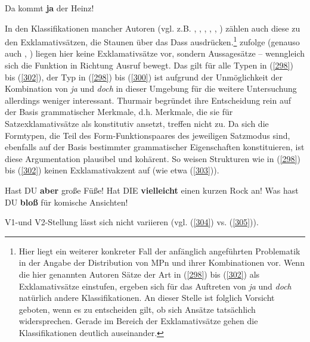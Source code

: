 \begin{exe}
	\ex\label{302} 
	Da kommt \textbf{ja} der Heinz!
	\hfill\hbox {\citet[107-108/215]{Thurmair1989}}
\end{exe}
In den Klassifikationen mancher Autoren (vgl. z.B. \citealt[13]{Weydt1983b}, \citealt[157]{Hentschel1986}, \citealt[313]{Foolen1989}, \citealt[166-167]{Helbig1990}, \citealt[197]{Karagjosova2004}, \citealt[160-168]{Rinas2006}) zählen auch diese zu den Exklamativsätzen, die Staunen über das Dass ausdrücken.\footnote{Hier liegt ein weiterer konkreter Fall der anfänglich angeführten Problematik in der Angabe der Distribution von MPn und ihrer Kombinationen vor. Wenn die hier genannten Autoren Sätze der Art in (\ref{298}) bis (\ref{302}) als Exklamativsätze einstufen, ergeben sich für das Auftreten von \textit{ja} und \textit{doch} natürlich andere Klassifikationen. An dieser Stelle ist folglich Vorsicht geboten, wenn es zu entscheiden gilt, ob sich Ansätze tatsächlich widersprechen. Gerade im Bereich der Exklamativsätze gehen die Klassifikationen deutlich auseinander.} \citet[107-108]{Thurmair1989} zufolge (genauso auch \citealt[77-80]{Doherty1985}, \citealt[37]{Kwon2005}) liegen hier keine Exklamativsätze vor, sondern Aussagesätze – wenngleich sich die Funktion in Richtung Ausruf bewegt. Das gilt für alle Typen in (\ref{298}) bis (\ref{302}), der Typ in (\ref{298}) bis (\ref{300}) ist aufgrund der Unmöglichkeit der Kombination von \textit{ja} und \textit{doch} in dieser Umgebung für die weitere Untersuchung allerdings weniger interessant. Thurmair begründet ihre Entscheidung rein auf der Basis grammatischer Merkmale, d.h. Merkmale, die sie für Satzex\-klamativsätze als konstitutiv ansetzt, treffen nicht zu. Da sich die Formtypen, die Teil des Form-Funktionspaares des jeweiligen Satzmodus sind, ebenfalls auf der Basis bestimmter grammatischer Eigenschaften konstituieren, ist diese Argumentation plausibel und kohärent. So weisen Strukturen wie in (\ref{298}) bis (\ref{302}) keinen Exklamativakzent  auf (wie etwa (\ref{303})).

\begin{exe}
	\ex\label{303} 
		\begin{xlist}	
			\ex\label{303a} Hast DU \textbf{aber} große Füße!
			\ex\label{303b} Hat DIE \textbf{vielleicht} einen kurzen Rock an!
			\ex\label{303c} Was hast DU \textbf{bloß} für komische Ansichten!
		\end{xlist}
\end{exe}	
V1-und V2-Stellung lässt sich nicht variieren (vgl. (\ref{304}) vs. (\ref{305})).


